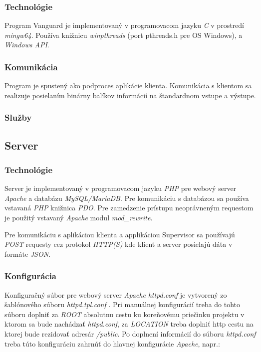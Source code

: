 \documentclass{article}
\newcommand{\file}[1]{\emph{#1}}
\begin{document}
\subsubsection{Technológie}

Program Vanguard je implementovaný v programovacom jazyku \emph{C} v prostredí \emph{mingw64}. Používa knižnicu \emph{winpthreads} (port pthreads.h pre OS Windows), a \emph{Windows API}.

\subsubsection{Komunikácia}

Program je spustený ako podproces aplikácie klienta. Komunikácia s klientom sa realizuje posielaním binárny balíkov informácií na štandardnom vstupe a výstupe.

\subsubsection{Služby}

\subsection{Server}

\subsubsection{Technológie}
Server je implementovaný v programovacom jazyku \emph{PHP} pre webový server \emph{Apache} a databázu \emph{MySQL/MariaDB}. Pre komunikáciu s databázou sa používa vstavaná \emph{PHP} knižnica \emph{PDO}.
Pre zamedzenie prístupu neoprávneným requestom je použitý vstavaný \emph{Apache} modul \emph{mod{\_}rewrite}.

Pre komunikáciu s aplikáciou klienta a applikáciou Supervisor sa používajú \emph{POST} requesty cez protokol \emph{HTTP(S)} kde klient a server posielajú dáta v formáte \emph{JSON}.

\subsubsection{Konfigurácia}

Konfiguračný súbor pre webový server \emph{Apache} \file{httpd.conf} je vytvorený zo šablónového súboru \file{httpd.tpl.conf} . Pri manuálnej konfigurácií treba do tohto súboru doplniť za \emph{ROOT} absolutnu cestu ku koreňovému priečinku projektu v ktorom sa bude nachádzať \file{httpd.conf}, za \emph{LOCATION} treba doplniť http cestu na ktorej bude rezidovať adresár \file{/public}. Po doplnení informácií do súboru \file{httpd.conf} treba túto konfiguráciu zahrnúť do hlavnej konfigurácie \emph{Apache}, napr.:
\end{document}
